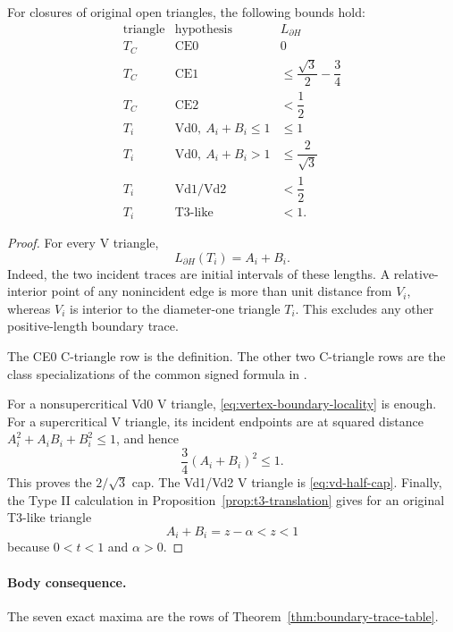 \begin{lemma}
\label{lem:app-boundary-trace-table-calculation}
For closures of original open triangles, the following bounds hold:
\[
 \begin{array}{c|c|c}
 \text{triangle}&\text{hypothesis}&L_{\partial H}\\ \hline
 T_C&\mathrm{CE0}&0\\
 T_C&\mathrm{CE1}&\le\dfrac{\sqrt3}{2}-\dfrac34\\[3pt]
 T_C&\mathrm{CE2}&<\dfrac12\\[3pt]
 T_i&\mathrm{Vd0},\ A_i+B_i\le1&\le1\\
 T_i&\mathrm{Vd0},\ A_i+B_i>1&\le\dfrac2{\sqrt3}\\[3pt]
 T_i&\mathrm{Vd1/Vd2}&<\dfrac12\\
 T_i&\text{T3-like}&<1.
 \end{array}
 \label{eq:app-boundary-trace-table}
\]
\end{lemma}

\begin{proof}
For every V triangle,
\begin{equation}
 L_{\partial H}(T_i)=A_i+B_i.
 \label{eq:vertex-boundary-locality}
\end{equation}
Indeed, the two incident traces are initial intervals of these lengths.  A
relative-interior point of any nonincident edge is more than unit distance
from $V_i$, whereas $V_i$ is interior to the diameter-one triangle $T_i$.
This excludes any other positive-length boundary trace.

The CE0 C-triangle row is the definition.  The other two C-triangle rows are
the class specializations of the common signed formula in
.

For a nonsupercritical Vd0 V triangle, \eqref{eq:vertex-boundary-locality} is enough.
For a supercritical V triangle, its incident endpoints are at squared distance
$A_i^2+A_iB_i+B_i^2\le1$, and hence
\[
 \frac34(A_i+B_i)^2\le1.
\]
This proves the $2/\sqrt3$ cap.  The Vd1/Vd2 V triangle is
\eqref{eq:vd-half-cap}.  Finally, the Type II calculation in
Proposition~\ref{prop:t3-translation} gives for an original T3-like triangle
\[
 A_i+B_i=z-\alpha<z<1
\]
because $0<t<1$ and $\alpha>0$.
\end{proof}

\paragraph{Body consequence.}
The seven exact maxima are the rows of
Theorem~\ref{thm:boundary-trace-table}.
